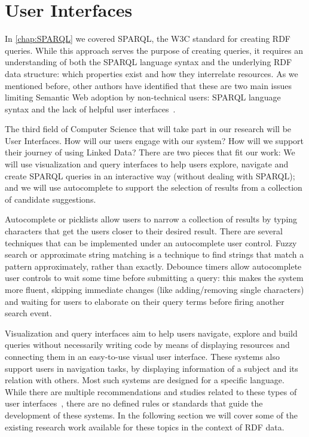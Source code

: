 \section{User Interfaces}

In \autoref{chap:SPARQL} we covered SPARQL, the W3C standard for creating RDF queries. While this approach serves the purpose of creating queries, it requires an understanding of both the SPARQL language syntax and the underlying RDF data structure: which properties exist and how they interrelate resources. As we mentioned before, other authors have identified that these are two main issues limiting Semantic Web adoption by non-technical users: SPARQL language syntax and the lack of helpful user interfaces~\cite{Ferre2016, Lehmann2014, Unger2014}.

The third field of Computer Science that will take part in our research will be User Interfaces. How will our users engage with our system? How will we support their journey of using Linked Data? There are two pieces that fit our work: We will use visualization and query interfaces to help users explore, navigate and create SPARQL queries in an interactive way (without dealing with SPARQL); and we will use autocomplete to support the selection of results from a collection of candidate suggestions. 

Autocomplete or picklists allow users to narrow a collection of results by typing characters that get the users closer to their desired result. There are several techniques that can be implemented under an autocomplete user control. Fuzzy search or approximate string matching is a technique to find strings that match a pattern approximately, rather than exactly. Debounce timers allow autocomplete user controls to wait some time before submitting a query: this makes the system more fluent, skipping immediate changes (like adding/removing single characters) and waiting for users to elaborate on their query terms before firing another search event.

Visualization and query interfaces aim to help users navigate, explore and build queries without necessarily writing code by means of displaying resources and connecting them in an easy-to-use visual user interface. These systems also support users in navigation tasks, by displaying information of a subject and its relation with others. Most such systems are designed for a specific language. While there are multiple recommendations and studies related to these types of user interfaces~\cite{Dadzie2011, Bikakis2016}, there are no defined rules or standards that guide the development of these systems. In the following section we will cover some of the existing research work available for these topics in the context of RDF data.

